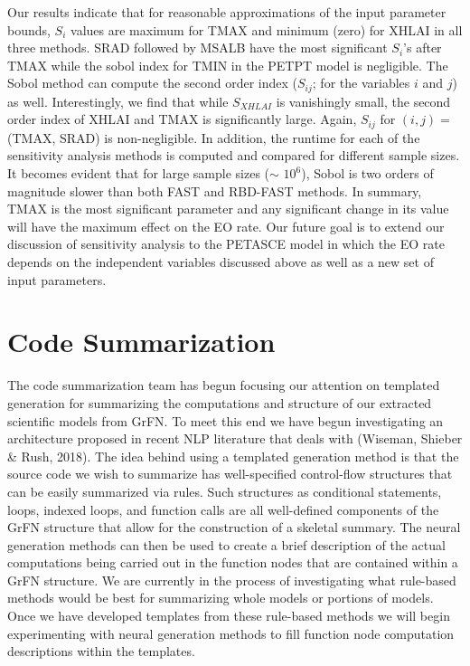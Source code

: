 \documentclass[article, 12pt, oneside]{memoir}
\begin{document}
Our results indicate that for reasonable approximations of the input
parameter bounds, \(S_i\) values are maximum for TMAX and minimum (zero)
for XHLAI in all three methods. SRAD followed by MSALB have the most
significant \(S_i\)'s after TMAX while the sobol index for TMIN in the
PETPT model is negligible. The Sobol method can compute the second order
index (\(S_{ij}\); for the variables \(i\) and \(j\)) as well.
Interestingly, we find that while \(S_{XHLAI}\) is vanishingly small,
the second order index of XHLAI and TMAX is significantly large. Again,
\(S_{ij}\) for \((i, j)=\) (TMAX, SRAD) is non-negligible. In addition,
the runtime for each of the sensitivity analysis methods is computed and
compared for different sample sizes. It becomes evident that for large
sample sizes (\(\sim\) \(10^6\)), Sobol is two orders of magnitude
slower than both FAST and RBD-FAST methods. In summary, TMAX is the most
significant parameter and any significant change in its value will have
the maximum effect on the EO rate. Our future goal is to extend our
discussion of sensitivity analysis to the PETASCE model in which the EO
rate depends on the independent variables discussed above as well as a
new set of input parameters.

\hypertarget{code-summarization}{%
\section{Code Summarization}\label{code-summarization}}

The code summarization team has begun focusing our attention on
templated generation for summarizing the computations and structure of
our extracted scientific models from GrFN. To meet this end we have
begun investigating an architecture proposed in recent NLP literature
that deals with (Wiseman, Shieber \& Rush, 2018). The idea behind using
a templated generation method is that the source code we wish to
summarize has well-specified control-flow structures that can be easily
summarized via rules. Such structures as conditional statements, loops,
indexed loops, and function calls are all well-defined components of the
GrFN structure that allow for the construction of a skeletal summary.
The neural generation methods can then be used to create a brief
description of the actual computations being carried out in the function
nodes that are contained within a GrFN structure. We are currently in
the process of investigating what rule-based methods would be best for
summarizing whole models or portions of models. Once we have developed
templates from these rule-based methods we will begin experimenting with
neural generation methods to fill function node computation descriptions
within the templates.
\end{document}
